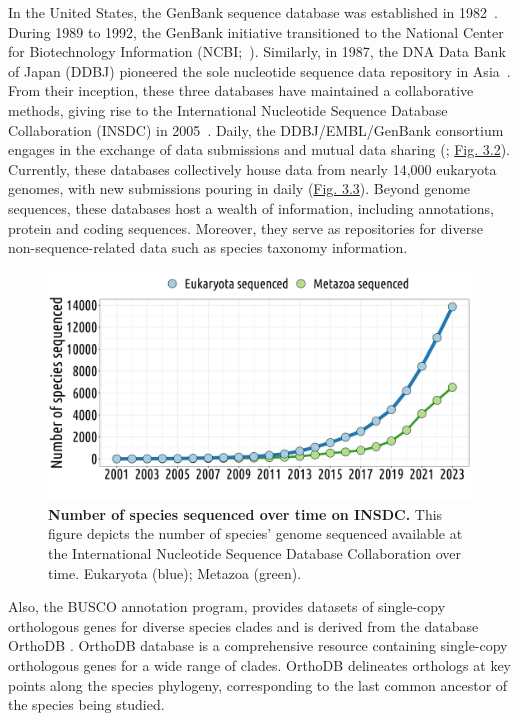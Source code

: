 In the United States, the GenBank sequence database was established in 1982~\citep{sayers_genbank_2022}. During 1989 to 1992, the GenBank initiative transitioned to the National Center for Biotechnology Information (\acrshort{NCBI};~\citet{ncbi_resource_coordinators_database_2018}). Similarly, in 1987, the DNA Data Bank of Japan (DDBJ) pioneered the sole nucleotide sequence data repository in Asia~\citep{tateno_dna_1997}.  From their inception, these three databases have maintained a collaborative methods, giving rise to the International Nucleotide Sequence Database Collaboration (INSDC) in 2005~\citep{karsch-mizrachi_international_2012}. Daily, the DDBJ/EMBL/GenBank consortium engages in the exchange of data submissions and mutual data sharing (\citet{brunak_nucleotide_2002}; \hyperref[fig:nbassemblyperdbinsdc]{Fig. 3.2}). Currently, these databases collectively house data from nearly 14,000 eukaryota genomes, with new submissions pouring in daily (\hyperref[fig:nbspeciesinsdc]{Fig. 3.3}). Beyond genome sequences, these databases host a wealth of information, including annotations, protein and coding sequences. Moreover, they serve as repositories for diverse non-sequence-related data such as species taxonomy information.

\begin{figure}[h]
    \centering
    \includegraphics[width=.7\linewidth]{figures/nb_species_insdc.jpg}
    \caption[Number of species sequenced over time on INSDC]{\textbf{Number of species sequenced over time on INSDC.} This figure depicts the number of species' genome sequenced available at the International Nucleotide Sequence Database Collaboration over time. Eukaryota (blue); Metazoa (green).\newline}
    \label{fig:nbspeciesinsdc}
\end{figure}

Also, the \acrshort{BUSCO} annotation program, provides datasets of single-copy orthologous genes for diverse species clades and is derived from the database OrthoDB \citep{kuznetsov_orthodb_2023, manni_busco_2021}. OrthoDB database is a comprehensive resource containing single-copy orthologous genes for a wide range of clades. OrthoDB delineates orthologs at key points along the species phylogeny, corresponding to the last common ancestor of the species being studied.

